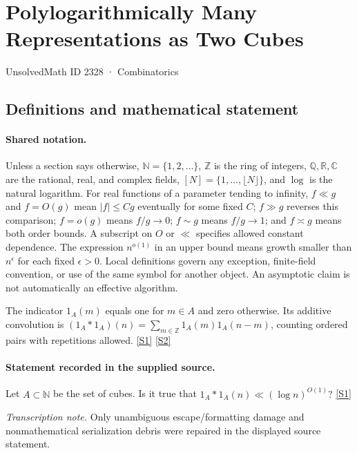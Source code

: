\documentclass[11pt,a4paper]{article}
\newcommand{\N}{\mathbb{N}}
\newcommand{\Z}{\mathbb{Z}}
\newcommand{\Q}{\mathbb{Q}}
\newcommand{\R}{\mathbb{R}}
\newcommand{\C}{\mathbb{C}}
\newcommand{\sref}[2]{\hyperlink{source:#1:#2}{[S#2]}}
\begin{document}

\setcounter{section}{2327}

\section{Polylogarithmically Many Representations as Two Cubes}\label{2328}

{\small\sffamily UnsolvedMath ID 2328 · Combinatorics}

\subsection{Definitions and mathematical statement}

\paragraph{Shared notation.}Unless a section says otherwise, $\N=\{1,2,\ldots\}$,
$\Z$ is the ring of integers, $\Q,\R,\C$ are the rational, real, and complex
fields, $[N]=\{1,\ldots,\lfloor N\rfloor\}$, and $\log$ is the natural
logarithm. For real functions of a parameter tending to infinity,
$f\ll g$ and $f=O(g)$ mean $|f|\leq Cg$ eventually for some fixed $C$;
$f\gg g$ reverses this comparison; $f=o(g)$ means $f/g\to0$;
$f\sim g$ means $f/g\to1$; and $f\asymp g$ means both order bounds.
A subscript on $O$ or $\ll$ specifies allowed constant dependence.
The expression $n^{o(1)}$ in an upper bound means growth smaller than
$n^\epsilon$ for each fixed $\epsilon>0$. Local definitions govern any
exception, finite-field convention, or use of the same symbol for another
object. An asymptotic claim is not automatically an effective algorithm.



The indicator $1_A(m)$ equals one for $m\in A$ and zero otherwise. Its additive convolution is $(1_A*1_A)(n)=\sum_{m\in\Z}1_A(m)1_A(n-m)$, counting ordered pairs with repetitions allowed. \sref{2328}{1} \sref{2328}{2}

\paragraph{Statement recorded in the supplied source.}
Let $A\subset\mathbb{N}$ be the set of cubes. Is it true that $ 1_A\ast 1_A(n) \ll (\log n)^{O(1)}? $ \sref{2328}{1}

{\small\emph{Transcription note.} Only unambiguous escape/formatting damage and nonmathematical serialization debris were repaired in the displayed source statement.}
\end{document}
